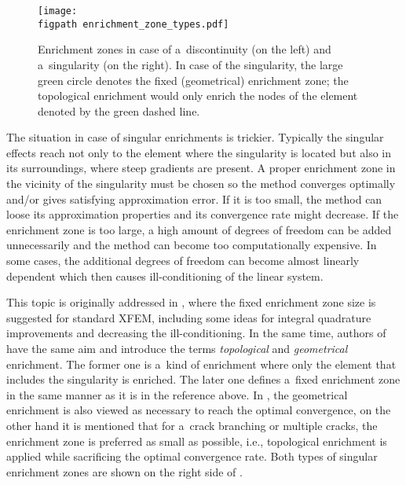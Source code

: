 \begin{figure}[!htb]
  \centering    
    \texttt{[image: \\figpath enrichment\_zone\_types.pdf]}
  \caption[Enrichment zone types]{Enrichment zones in case of a~discontinuity (on the left) and a~singularity (on the right).
  In case of the singularity, the large green circle denotes the fixed (geometrical) enrichment zone; the topological enrichment would
  only enrich the nodes of the element denoted by the green dashed line.}
  \label{fig:enrichment_zone_types}
\end{figure}
The situation in case of singular enrichments is trickier.
Typically the singular effects reach not only to the element where the singularity is located but also in its surroundings,
where steep gradients are present.
A proper enrichment zone in the vicinity of the singularity must be chosen so the method converges optimally
and/or gives satisfying approximation error. If it is too
small, the method can loose its approximation properties and its convergence rate might decrease. If the enrichment zone is too large,
a high amount of degrees of freedom can be added unnecessarily and the method can become too computationally expensive.
In some cases, the additional degrees of freedom can become almost linearly dependent which then causes ill-conditioning of the linear system.

This topic is originally addressed in \cite{laborde_highorder_2005}, where the fixed enrichment zone size is suggested for standard XFEM,
including some ideas for integral quadrature improvements and decreasing the ill-conditioning. In the same time, authors of \cite{bechet_improved_2005}
have the same aim and introduce the terms \emph{topological} and \emph{geometrical} enrichment. The former one is a~kind of enrichment where only the element
that includes the singularity is enriched. The later one defines a~fixed enrichment zone in the same manner as it is in the reference above.
In \cite{fries_corrected_2008}, the geometrical enrichment is also viewed as necessary to reach the optimal convergence, on the other hand
it is mentioned that for a~crack branching or multiple cracks, the enrichment zone is preferred as small as possible, i.e., topological enrichment is applied
while sacrificing the optimal convergence rate.
Both types of singular enrichment zones are shown on the right side of .

